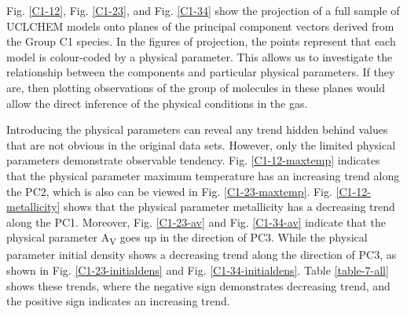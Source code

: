 \documentclass{aa}
\begin{document}
\begin{CJK*}{UTF8}{gbsn}
   
    Fig. \ref{C1-12}, Fig. \ref{C1-23}, and Fig. \ref{C1-34} show the projection of a full sample of UCLCHEM models onto planes of the principal component vectors derived from the Group C1 species. 
    In the figures of projection, the points represent that each model is colour-coded by a physical parameter. 
    This allows us to investigate the relationship between the components and particular physical parameters. 
    If they are, then plotting observations of the group of molecules in these planes would allow the direct inference of the physical conditions in the gas. 
    
    Introducing the physical parameters can reveal any trend hidden behind values that are not obvious in the original data sets. 
    However, only the limited physical parameters demonstrate observable tendency. 
    Fig. \ref{C1-12-maxtemp} indicates that the physical parameter maximum temperature has an increasing trend along the PC2, which is also can be viewed in Fig. \ref{C1-23-maxtemp}. 
    Fig. \ref{C1-12-metallicity} shows that the physical parameter metallicity has a decreasing trend along the PC1. 
    Moreover, Fig. \ref{C1-23-av} and Fig. \ref{C1-34-av} indicate that the physical parameter A\textsubscript{V} goes up in the direction of PC3.
    While the physical parameter initial density shows a decreasing trend along the direction of PC3, as shown in Fig. \ref{C1-23-initialdens} and Fig. \ref{C1-34-initialdens}. 
    Table \ref{table-7-all} shows these trends, where the negative sign demonstrates decreasing trend, and the positive sign indicates an increasing trend.
    

\end{CJK*}
\end{document}
